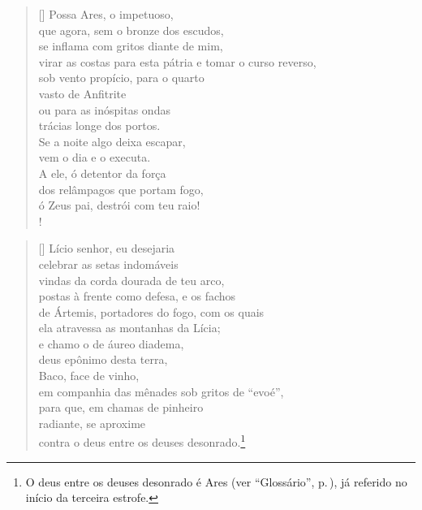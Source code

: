 \settowidth{\versewidth}{brilhante? Tenso, agito-me com medo em meu trêmulo}
\begin{verse}[\versewidth]
Possa Ares, o impetuoso,\\
que agora, sem o bronze dos escudos,\\
se inflama com gritos diante de mim,\\
virar as costas para esta pátria e tomar o curso reverso,\\
sob vento propício, para o quarto\\
vasto de Anfitrite\\
ou para as inóspitas ondas\\
trácias longe dos portos.\\
Se a noite algo deixa escapar,\\
vem o dia e o executa.\\
A ele, ó detentor da força\\
dos relâmpagos que portam fogo,\\
ó Zeus pai, destrói com teu raio!\\!
\end{verse}


\settowidth{\versewidth}{brilhante? Tenso, agito-me com medo em meu trêmulo}
\begin{verse}[\versewidth]
Lício senhor, eu desejaria\\ 
celebrar as setas indomáveis\\
vindas da corda dourada de teu arco,\\
postas à frente como defesa, e os fachos\\
de Ártemis, portadores do fogo, com os quais\\
ela atravessa as montanhas da Lícia;\\
e chamo o de áureo diadema,\\
deus epônimo desta terra,\\
Baco, face de vinho,\\
em companhia das mênades sob gritos de ``evoé'',\\
para que, em chamas de pinheiro\\
radiante, se aproxime\\
contra o deus entre os deuses desonrado.\footnote{O deus entre os deuses desonrado é Ares (ver ``Glossário'', p.\,\pageref{glossario}), já referido no início da terceira estrofe.}
\end{verse}


